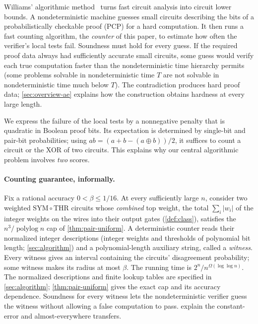 \documentclass[11pt,letterpaper]{article}
\theoremstyle{definition}
\theoremstyle{remark}
\newcommand{\THR}{\mathrm{THR}}
\newcommand{\SYM}{\mathrm{SYM}}
\newcommand{\abs}[1]{\left|#1\right|}
\begin{document}
Williams' algorithmic method~\cite{Wil13} turns fast circuit analysis
into circuit lower bounds. A nondeterministic machine guesses small
circuits describing the bits of a probabilistically checkable proof
(PCP) for a hard computation. It then runs a fast counting algorithm,
the \emph{counter} of this paper, to estimate how often the verifier's
local tests fail. Soundness must hold for every
guess. If the required proof data always had sufficiently accurate
small circuits, some guess would verify each true computation faster
than the nondeterministic time hierarchy permits (some problems
solvable in nondeterministic time \(T\) are not solvable in
nondeterministic time much below \(T\)). The contradiction
produces hard proof data; \cref{sec:overview-ae} explains how the
construction obtains hardness at every large length.

We express the failure of the local tests by a nonnegative penalty
that is quadratic in Boolean proof bits. Its expectation is determined
by single-bit and pair-bit probabilities; using
\(ab=(a+b-(a\oplus b))/2\), it suffices to count a circuit or the
XOR of two circuits. This explains why our central algorithmic
problem involves \emph{two} scores.

\paragraph{Counting guarantee, informally.}
Fix a rational accuracy \(0<\beta\le1/16\). At every sufficiently
large \(n\), consider two weighted \(\SYM\circ\THR\) circuits whose
\emph{combined} top weight, the total \(\sum_i\abs{w_i}\) of the
integer weights on the wires into their output gates
(\cref{def:class}), satisfies the
\(n^3/\operatorname{polylog}n\) cap of \cref{thm:pair-uniform}.
A deterministic counter reads their normalized integer descriptions
(integer weights and thresholds of polynomial bit length;
\cref{sec:algorithm}) and a polynomial-length auxiliary string, called a \emph{witness}.
Every witness gives an interval containing the circuits' disagreement
probability; some witness makes its radius at most \(\beta\).
The running time is \(2^n/n^{\Omega(\log\log n)}\).
The normalized descriptions and finite lookup tables are specified
in \cref{sec:algorithm}; \cref{thm:pair-uniform} gives the exact cap
and its accuracy dependence. Soundness for every witness lets the
nondeterministic verifier guess the witness without allowing a
false computation to pass. 
explain the constant-error and almost-everywhere transfers.
\end{document}
